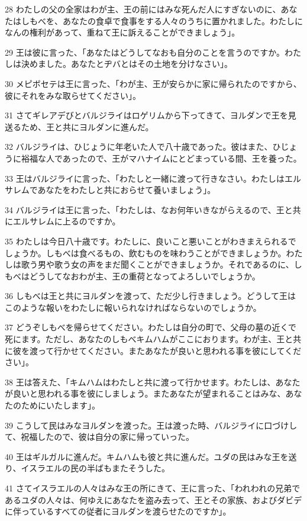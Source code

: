 \par 28 わたしの父の全家はわが主、王の前にはみな死んだ人にすぎないのに、あなたはしもべを、あなたの食卓で食事をする人々のうちに置かれました。わたしになんの権利があって、重ねて王に訴えることができましょう」。
\par 29 王は彼に言った、「あなたはどうしてなおも自分のことを言うのですか。わたしは決めました。あなたとヂバとはその土地を分けなさい」。
\par 30 メピボセテは王に言った、「わが主、王が安らかに家に帰られたのですから、彼にそれをみな取らせてください」。
\par 31 さてギレアデびとバルジライはロゲリムから下ってきて、ヨルダンで王を見送るため、王と共にヨルダンに進んだ。
\par 32 バルジライは、ひじょうに年老いた人で八十歳であった。彼はまた、ひじょうに裕福な人であったので、王がマハナイムにとどまっている間、王を養った。
\par 33 王はバルジライに言った、「わたしと一緒に渡って行きなさい。わたしはエルサレムであなたをわたしと共におらせて養いましょう」。
\par 34 バルジライは王に言った、「わたしは、なお何年いきながらえるので、王と共にエルサレムに上るのですか。
\par 35 わたしは今日八十歳です。わたしに、良いこと悪いことがわきまえられるでしょうか。しもべは食べるもの、飲むものを味わうことができましょうか。わたしは歌う男や歌う女の声をまだ聞くことができましょうか。それであるのに、しもべはどうしてなおわが主、王の重荷となってよろしいでしょうか。
\par 36 しもべは王と共にヨルダンを渡って、ただ少し行きましょう。どうして王はこのような報いをわたしに報いられなければならないのでしょうか。
\par 37 どうぞしもべを帰らせてください。わたしは自分の町で、父母の墓の近くで死にます。ただし、あなたのしもべキムハムがここにおります。わが主、王と共に彼を渡って行かせてください。またあなたが良いと思われる事を彼にしてください」。
\par 38 王は答えた、「キムハムはわたしと共に渡って行かせます。わたしは、あなたが良いと思われる事を彼にしましょう。またあなたが望まれることはみな、あなたのためにいたします」。
\par 39 こうして民はみなヨルダンを渡った。王は渡った時、バルジライに口づけして、祝福したので、彼は自分の家に帰っていった。
\par 40 王はギルガルに進んだ。キムハムも彼と共に進んだ。ユダの民はみな王を送り、イスラエルの民の半ばもまたそうした。
\par 41 さてイスラエルの人々はみな王の所にきて、王に言った、「われわれの兄弟であるユダの人々は、何ゆえにあなたを盗み去って、王とその家族、およびダビデに伴っているすべての従者にヨルダンを渡らせたのですか」。
